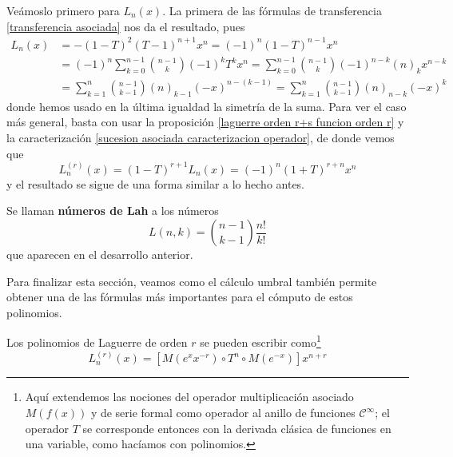 \begin{demo}
    Veámoslo primero para $L_n(x)$. La primera de las fórmulas de transferencia \ref{transferencia asociada} nos da el resultado, pues
    \begin{align*}
        L_n(x) & = -(1-T)^2(T-1)^{n+1}x^n = (-1)^n (1-T)^{n-1} x^n \\ 
        & = (-1)^n \sum_{k=0}^{n-1} \binom{n-1}{k} (-1)^k T^k x^n = \sum_{k=0}^{n-1} \binom{n-1}{k} (-1)^{n-k} (n)_k x^{n-k} \\
        & = \sum_{k=1}^{n} \binom{n-1}{k-1} (n)_{k-1} (-x)^{n-(k-1)}
        = \sum_{k=1}^{n} \binom{n-1}{k-1} (n)_{n-k} (-x)^{k}
    \end{align*}
    donde hemos usado en la última igualdad la simetría de la suma. Para ver el caso más general, basta con usar la proposición \ref{laguerre orden r+s funcion orden r} y la caracterización \ref{sucesion asociada caracterizacion operador}, de donde vemos que
    \begin{equation*}
        L_n^{(r)}(x) = (1-T)^{r+1} L_n(x) = (-1)^n (1+T)^{r+n} x^n
    \end{equation*}
y el resultado se sigue de una forma similar a lo hecho antes.
\end{demo}

\begin{definicion}
    Se llaman \textbf{números de Lah} a los números
    \begin{equation*}
        L(n, k) = \binom{n-1}{k-1}\frac{n!}{k!}
    \end{equation*}
    que aparecen en el desarrollo anterior. 
\end{definicion}

Para finalizar esta sección, veamos como el cálculo umbral también permite obtener una de las fórmulas más importantes para el cómputo de estos polinomios.

\begin{teorema}
    Los polinomios de Laguerre de orden $r$ se pueden escribir como\footnote{Aquí extendemos las nociones del operador multiplicación asociado $M(f(x))$ y de serie formal como operador al anillo de funciones $\mathcal{C}^\infty$; el operador $T$ se corresponde entonces con la derivada clásica de funciones en una variable, como hacíamos con polinomios.}
    \begin{equation*}
        L_n^{(r)}(x) = [M(e^x x^{-r}) \circ T^n \circ M(e^{-x})] x^{n+r}
    \end{equation*} 
\end{teorema}

